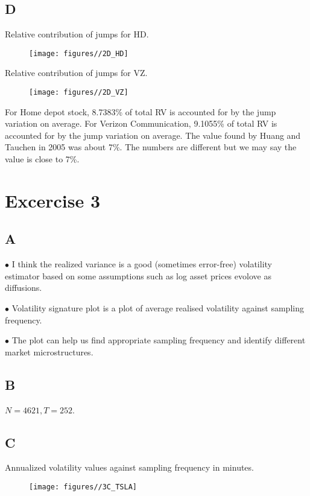 \documentclass{report}
\begin{document}
\subsection{D}
Relative contribution of jumps for HD.
\begin{figure}[H]
        \centering 
         \texttt{[image: figures//2D\_HD]}
\end{figure}
Relative contribution of jumps for VZ.
\begin{figure}[H]
        \centering 
         \texttt{[image: figures//2D\_VZ]}
\end{figure}

For Home depot stock, 8.7383\% of total RV is accounted for by the jump variation on average. For Verizon Communication, 9.1055\% of total RV is accounted for by the jump variation on average. The value found by Huang and Tauchen in 2005 was about 7\%. The numbers are different but we may say the value is close to 7\%.

\section{ Excercise 3}

\subsection{A}

$\bullet$ I think the realized variance is a good (sometimes error-free) volatility estimator based on some assumptions  such as log asset prices evolove as diffusions. 

$\bullet$ Volatility signature plot is a plot of average realised volatility against sampling frequency.

$\bullet$ The plot can help us find appropriate sampling frequency and identify different market microstructures.

\subsection{ B}
$ N = 4621, T = 252$.

\subsection{C}
Annualized volatility values against sampling frequency in minutes.
\begin{figure}[H]
        \centering 
         \texttt{[image: figures//3C\_TSLA]}
\end{figure}
\end{document}

